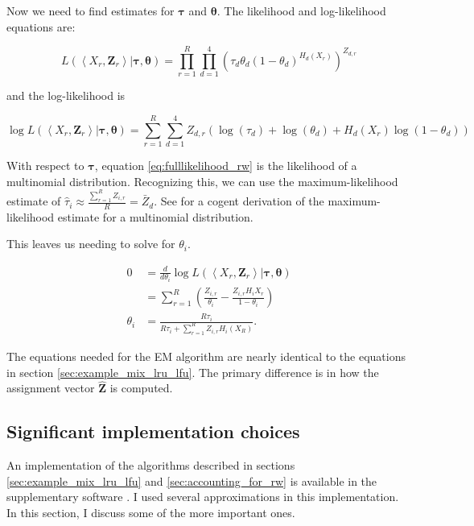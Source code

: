   Now we need to find estimates for $\bm{\tau}$ and $\bm{\theta}$. The
  likelihood and log-likelihood equations are:

  \begin{equation}
  \label{eq:fulllikelihood_rw}
    L \left( \left< X_r, \bm{Z}_r \right> |
             \bm{\tau}, \bm{\theta} \right) =
      \prod_{r=1}^{R} \prod_{d=1}^{4} \left(
        \tau_d \theta_d (1 - \theta_d)^{H_d(X_r)} \right)^{Z_{d, r}}
  \end{equation}

  \noindent
  and the log-likelihood is

  \begin{equation}
  \label{eq:loglikelihood_rw}
    \log L \left( \left< X_r, \bm{Z}_r \right> |
                 \bm{\tau}, \bm{\theta} \right) =
        \sum_{r=1}^{R} \sum_{d=1}^{4}
          Z_{d,r} \left(
            \log(\tau_d) +
            \log(\theta_d) +
            H_d(X_r) \log(1 - \theta_d)
          \right)
  \end{equation}

  With respect to $\bm{\tau}$, equation \ref{eq:fulllikelihood_rw} is the
  likelihood of a multinomial distribution. Recognizing this, we can use the
  maximum-likelihood estimate of $\hat{\tau}_i \approx \frac{\sum_{r=1}^{R}
  Z_{i, r}}{R} = \bar{Z}_d$. See \cite{murphybinomial} for a cogent derivation
  of the maximum-likelihood estimate for a multinomial distribution.

  This leaves us needing to solve for $\theta_i$.

  \begin{align}
    0 &= \frac{d}{d \theta_i} \log L \left(
      \left< X_r, \bm{Z}_r \right> | \bm{\tau}, \bm{\theta} \right) \\
      &= \sum_{r=1}^{R}
      \left(
        \frac{Z_{i,r}}{\theta_i} - \frac{Z_{i, r} H_i{X_r}}{1 - \theta_i}
      \right) \\
    \theta_i &= \frac{R \tau_i}{R \tau_i + \sum_{r=1}^{R} Z_{i,r} H_i(X_R)} .
  \end{align}

  The equations needed for the EM algorithm are nearly identical to the
  equations in section \ref{sec:example_mix_lru_lfu}. The primary difference is
  in how the assignment vector $\hat{\bm{Z}}$ is computed.

\subsection{Significant implementation choices}
  An implementation of the algorithms described in sections
  \ref{sec:example_mix_lru_lfu} and \ref{sec:accounting_for_rw} is available in
  the supplementary software \cite{supplimental}. I used several approximations
  in this implementation. In this section, I discuss some of the more important
  ones.


